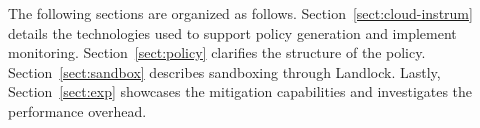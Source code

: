 The following sections are organized as
follows. Section~\ref{sect:cloud-instrum} details the technologies
used to support policy generation and implement
monitoring. Section~\ref{sect:policy} clarifies the structure of the
policy. Section~\ref{sect:sandbox} describes sandboxing through
Landlock. Lastly, Section~\ref{sect:exp} showcases the mitigation
capabilities and investigates the performance overhead.


